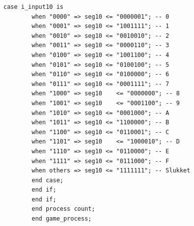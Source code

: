 \begin{enumerate}
\begin{lstlisting}[caption={Behavioral style kode for Guessgame},label={lst:Guessgame}]
		case i_input10 is
		when "0000" => seg10 <= "0000001"; -- 0
		when "0001" => seg10 <= "1001111"; -- 1
		when "0010" => seg10 <= "0010010"; -- 2
		when "0011" => seg10 <= "0000110"; -- 3
		when "0100" => seg10 <= "1001100"; -- 4
		when "0101" => seg10 <= "0100100"; -- 5
		when "0110" => seg10 <= "0100000"; -- 6
		when "0111" => seg10 <= "0001111"; -- 7
		when "1000" => seg10	<= "0000000"; -- 8
		when "1001" => seg10	<= "0001100"; -- 9
		when "1010" => seg10 <= "0001000"; -- A
		when "1011" => seg10 <= "1100000"; -- B
		when "1100" => seg10 <= "0110001"; -- C
		when "1101" => seg10	<= "1000010"; -- D
		when "1110" => seg10 <= "0110000"; -- E
		when "1111" => seg10 <= "0111000"; -- F
		when others => seg10 <= "1111111"; -- Slukket
		end case;
		end if;
		end if;
		end process count;
		end game_process;
		
		
		

\end{lstlisting}
\end{enumerate}
